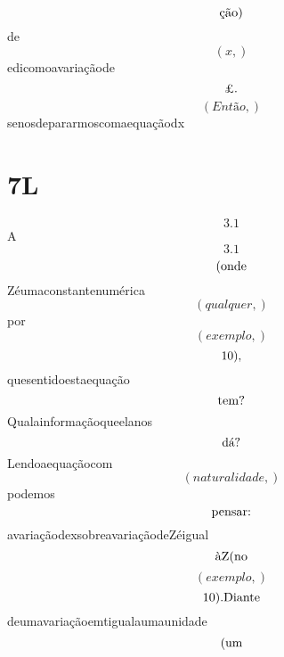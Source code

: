 \documentclass{article}
\begin{document}
\begin{equation}
\end{equation}\begin{equation}
$ção)$
\end{equation}de\begin{equation}
\left( x,\right)
\end{equation}edicomoavariaçãode\begin{equation}
$£.$
\end{equation}\begin{equation}
\left( Então,\right)
\end{equation}senosdepararmoscomaequaçãodx\section{7L}\begin{equation}
3.1
\end{equation}A\begin{equation}
3.1
\end{equation}\begin{equation}
$(onde$
\end{equation}Zéumaconstantenumérica\begin{equation}
\left( qualquer,\right)
\end{equation}por\begin{equation}
\left( exemplo,\right)
\end{equation}\begin{equation}
$10),$
\end{equation}quesentidoestaequação\begin{equation}
$tem?$
\end{equation}Qualainformaçãoqueelanos\begin{equation}
$dá?$
\end{equation}Lendoaequaçãocom\begin{equation}
\left( naturalidade,\right)
\end{equation}podemos\begin{equation}
$pensar:$
\end{equation}avariaçãodexsobreavariaçãodeZéigual\begin{equation}
$àZ(no$
\end{equation}\begin{equation}
\left( exemplo,\right)
\end{equation}\begin{equation}
$10).Diante$
\end{equation}deumavariaçãoemtigualaumaunidade\begin{equation}
$(um$

\end{equation}
\end{document}
